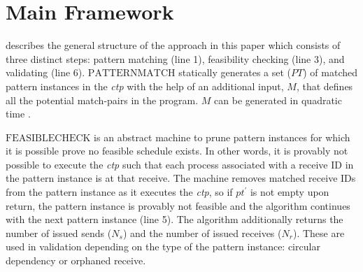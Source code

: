 \section{Main Framework}



 describes the general structure of the approach in this paper which consists of three distinct steps: pattern matching (line 1), feasibility checking (line 3), and validating (line 6). $\mathrm{PATTERNMATCH}$ statically generates a set ($\mathit{PT}$) of matched pattern instances in the \emph{ctp} with the help of an additional input, $M$, that defines all the potential match-pairs in the program. $M$ can be generated in quadratic time \cite{DBLP:conf/kbse/HuangMM13}. 

$\mathrm{FEASIBLECHECK}$ is an abstract machine to prune pattern instances for which it is possible prove no feasible schedule exists. In other words, it is provably not possible to execute the \emph{ctp} such that each process associated with a receive ID in the pattern instance is at that receive. The machine removes matched receive IDs from the pattern instance as it executes the \emph{ctp}, so if $\mathit{pt^\prime}$ is not empty upon return, the pattern instance is provably not feasible and the algorithm continues with the next pattern instance (line 5). The algorithm additionally returns the number of issued sends ($\mathit{N_s}$) and the number of issued receives ($\mathit{N_r}$). These are used in validation depending on the type of the pattern instance: circular dependency or orphaned receive.


